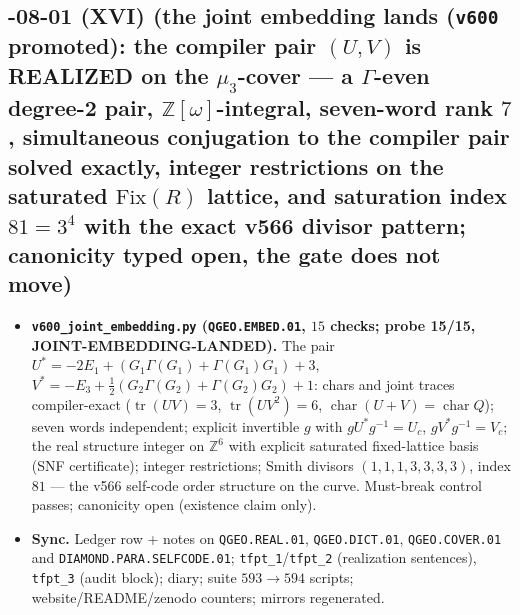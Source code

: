 \subsection*{-08-01 (XVI) (the joint embedding lands (\texttt{v600} promoted): the compiler pair $(U,V)$ is REALIZED on the $\mu_3$-cover --- a $\Gamma$-even degree-2 pair, $\mathbb{Z}[\omega]$-integral, seven-word rank $7$, simultaneous conjugation to the compiler pair solved exactly, integer restrictions on the saturated $\mathrm{Fix}(R)$ lattice, and saturation index $81=3^4$ with the exact v566 divisor pattern; canonicity typed open, the gate does not move)}
\begin{itemize}[leftmargin=1.5em]
\item \textbf{\texttt{v600\_joint\_embedding.py} (\texttt{QGEO.EMBED.01}, $15$ checks; probe
15/15, JOINT-EMBEDDING-LANDED).} The pair $U^*=-2E_1+(G_1\Gamma(G_1)+\Gamma(G_1)G_1)+3$,
$V^*=-E_3+\tfrac12(G_2\Gamma(G_2)+\Gamma(G_2)G_2)+1$: chars and joint traces compiler-exact
($\operatorname{tr}(UV)=3$, $\operatorname{tr}(UV^2)=6$, $\operatorname{char}(U{+}V)=
\operatorname{char}Q$); seven words independent; explicit invertible $g$ with
$gU^*g^{-1}=U_c$, $gV^*g^{-1}=V_c$; the real structure integer on $\mathbb{Z}^6$ with
explicit saturated fixed-lattice basis (SNF certificate); integer restrictions; Smith
divisors $(1,1,1,3,3,3,3)$, index $81$ --- the v566 self-code order structure on the curve.
Must-break control passes; canonicity open (existence claim only).
\item \textbf{Sync.} Ledger row + notes on \texttt{QGEO.REAL.01},
\texttt{QGEO.DICT.01}, \texttt{QGEO.COVER.01} and
\texttt{DIAMOND.PARA.SELFCODE.01};
\texttt{tfpt\_1}/\texttt{tfpt\_2} (realization sentences), \texttt{tfpt\_3} (audit block);
diary; suite $593\to594$ scripts; website/README/zenodo counters; mirrors regenerated.
\end{itemize}

